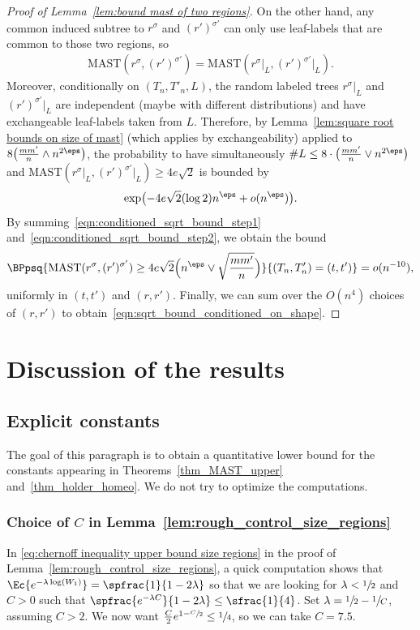 \begin{proof}[Proof of Lemma~\ref{lem:bound mast of two regions}]
On the other hand, any common induced subtree to $r^\sigma$ and $(r')^{\sigma'}$ can only use leaf-labels that are common to those two regions, so
\begin{align*}
\mathrm{MAST}(r^\sigma, (r')^{\sigma'})=\mathrm{MAST}(r^\sigma{|_L}, (r')^{\sigma'}{|_L}).
\end{align*}
Moreover, conditionally on $(T_n, T'_n,L)$, the random labeled trees $r^\sigma{|_L}$ and $(r')^{\sigma'}{|_L}$ are independent (maybe with different distributions) and have exchangeable leaf-labels taken from $L$. Therefore, by Lemma~\ref{lem:square root bounds on size of mast} (which applies by exchangeability) applied to $8 \bigl( \frac{mm'}{n} \wedge n^{2\eps} \bigr)$, the probability to have simultaneously $\#L \leq 8 \cdot \bigl(\frac{m m'}{n} \vee n^{2\eps} \bigr)$ and $\mathrm{MAST}(r^{\sigma}{|_L}, (r')^{\sigma'}{|_L})\geq 4e\sqrt{2}$ is bounded by
\begin{equation}\label{eqn:conditioned_sqrt_bound_step2}
\exp\bigl(-4e\sqrt{2}(\log 2) n^\eps + o(n^\eps) \bigr).
\end{equation}
By summing~\eqref{eqn:conditioned_sqrt_bound_step1} and~\eqref{eqn:conditioned_sqrt_bound_step2}, we obtain the bound
\[\BPpsq{\mathrm{MAST}(r^\sigma, (r')^{\sigma'})\geq 4e\sqrt{2} \Bigl( n^\eps \vee \sqrt{\frac{m m'}{n}} \Bigr)}{(T_n,T'_n)=(t,t')}=o(n^{-10}),\]
uniformly in $(t,t')$ and $(r,r')$. Finally, we can sum over the $O(n^4)$ choices of $(r,r')$ to obtain~\eqref{eqn:sqrt_bound_conditioned_on_shape}.
\end{proof}

\section{Discussion of the results} \label{sec:discussion of the results}

\subsection{Explicit constants}\label{subsec:explicit constants}

The goal of this paragraph is to obtain a quantitative lower bound for the constants appearing in Theorems~\ref{thm_MAST_upper} and~\ref{thm_holder_homeo}. We do not try to optimize the computations.

\subsubsection*{Choice of $C$ in Lemma~\ref{lem:rough_control_size_regions}}
In \eqref{eq:chernoff inequality upper bound size regions} in the proof of Lemma~\ref{lem:rough_control_size_regions}, a quick computation shows that $\Ec{e^{-\lambda \log(W_1)}}= \spfrac{1}{1-2\lambda}$ so that we are looking for $\lambda<\sfrac{1}{2}$ and $C>0$ such that $\spfrac{e^{-\lambda C}}{1-2\lambda} \leq \sfrac{1}{4}$.
Set $\lambda=\sfrac{1}{2}-\sfrac{1}{C}$, assuming $C>2$. We now want $\frac{C}{2}e^{1-\sfrac{C}{2}} \leq \sfrac{1}{4}$, so we can take $C=7.5$.

